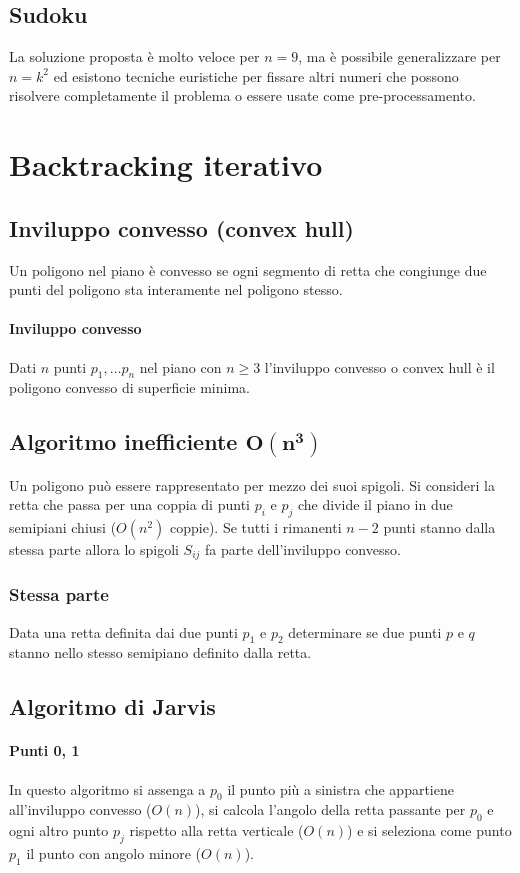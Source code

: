 \subsection{Sudoku}
La soluzione proposta \`e molto veloce per $n=9$, ma \`e possibile generalizzare per $n=k^2$ ed esistono tecniche euristiche per fissare altri numeri che possono risolvere completamente
il problema o essere usate come pre-processamento.
\begin{multicols}{2}

\columnbreak

\end{multicols}

\section{Backtracking iterativo}
\subsection{Inviluppo convesso (convex hull)}
Un poligono nel piano \`e convesso se ogni segmento di retta che congiunge due punti del poligono sta interamente nel poligono stesso.
\paragraph{Inviluppo convesso}
Dati $n$ punti $p_1, \dots p_n$ nel piano con $n\ge 3$ l'inviluppo convesso o convex hull \`e il poligono convesso di superficie minima.
\subsection{Algoritmo inefficiente $\mathbf{O(n^3)}$}
Un poligono pu\`o essere rappresentato per mezzo dei suoi spigoli. Si consideri la retta che passa per una coppia di punti $p_i$ e $p_j$ che divide il piano in due semipiani chiusi
($O(n^2)$ coppie). Se tutti i rimanenti $n-2$ punti stanno dalla stessa parte allora lo spigoli $S_{ij}$ fa parte dell'inviluppo convesso.
\subsubsection{Stessa parte}
Data una retta definita dai due punti $p_1$ e $p_2$ determinare se due punti $p$ e $q$ stanno nello stesso semipiano definito dalla retta.

\subsection{Algoritmo di Jarvis}
\paragraph{Punti 0, 1}
In questo algoritmo si assenga a $p_0$ il punto pi\`u a sinistra che appartiene all'inviluppo convesso ($O(n)$), si calcola l'angolo della retta passante per $p_0$ e ogni altro punto
$p_j$ rispetto alla retta verticale ($O(n)$) e si seleziona come punto $p_1$ il punto con angolo minore ($O(n)$).

